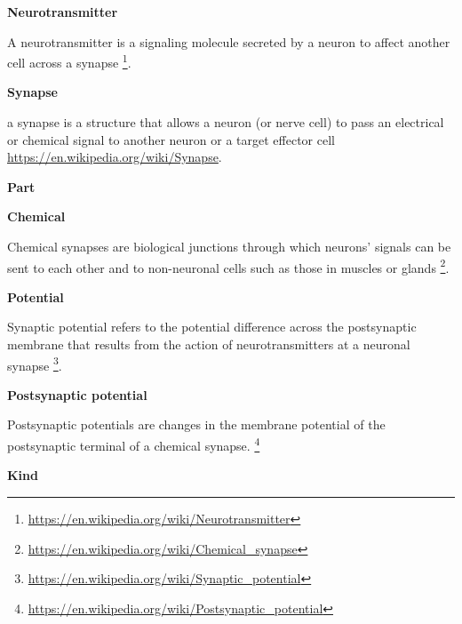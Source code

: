 \documentclass{book}
\providecommand{\ProjectDeepHeading}[2]{%
    \par\medskip\noindent\textbf{#2}\par\smallskip
}
\providecommand{\seeherefooter}[1]{\footnote{\url{#1}}}
\begin{document}
\ProjectDeepHeading{4}{Neurotransmitter}


A neurotransmitter is a signaling molecule secreted by a neuron to affect another cell across a synapse \seeherefooter{https://en.wikipedia.org/wiki/Neurotransmitter}.

\ProjectDeepHeading{3}{Synapse}


a synapse is a structure that allows a neuron (or nerve cell) to pass an electrical or chemical signal to another neuron or a target effector cell \url{https://en.wikipedia.org/wiki/Synapse}.

\ProjectDeepHeading{4}{Part}

\ProjectDeepHeading{5}{Chemical}


Chemical synapses are biological junctions through which neurons' signals can be sent to each other and to non-neuronal cells such as those in muscles or glands \seeherefooter{https://en.wikipedia.org/wiki/Chemical_synapse}.

\ProjectDeepHeading{5}{Potential}


Synaptic potential refers to the potential difference across the postsynaptic membrane that results from the action of neurotransmitters at a neuronal synapse \seeherefooter{https://en.wikipedia.org/wiki/Synaptic_potential}.

\ProjectDeepHeading{6}{Postsynaptic potential}


Postsynaptic potentials are changes in the membrane potential of the postsynaptic terminal of a chemical synapse.
    \seeherefooter{https://en.wikipedia.org/wiki/Postsynaptic_potential}

\ProjectDeepHeading{7}{Kind}
\end{document}
